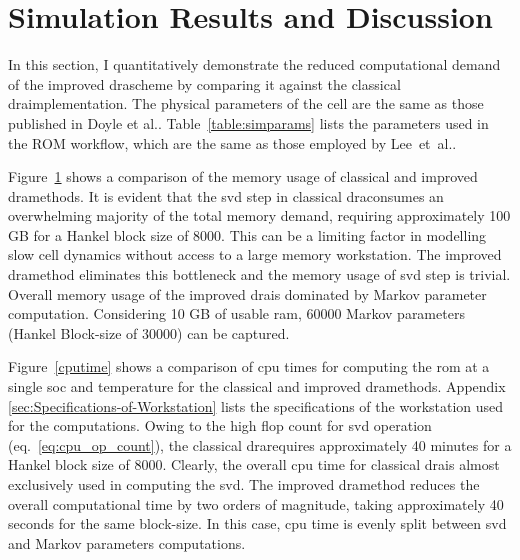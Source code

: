 \section{Simulation Results and Discussion\label{sec:Results} }

In this section, I quantitatively demonstrate the reduced computational
demand of the improved \gls{dra}scheme by comparing it against the classical
\gls{dra}implementation. The physical parameters of the cell are the same
as those published in Doyle et al.\cite{FullerDoyleNewman1994}.
Table~\ref{table:simparams} lists the parameters used in the ROM
workflow, which are the same as those employed by Lee~et~al.\cite{LeeChemistruckPlett2012}.

\begin{figure}
	\caption{}
	\label{memory}
\end{figure}

Figure~\ref{memory} shows a comparison of the memory usage of
classical and improved \gls{dra}methods. It is evident that the \gls{svd} step
in classical \gls{dra}consumes an overwhelming majority of the total memory
demand, requiring approximately 100 GB for a Hankel block size of
8000. This can be a limiting factor in modelling slow cell dynamics
without access to a large memory workstation. The improved \gls{dra}method
eliminates this bottleneck and the memory usage of \gls{svd} step is trivial.
Overall memory usage of the improved \gls{dra}is dominated by Markov parameter
computation. Considering 10 GB of usable \gls{ram}, 60000 Markov parameters
(Hankel Block-size of 30000) can be captured.

Figure~\ref{cputime} shows a comparison of \gls{cpu} times for computing
the \gls{rom} at a single \gls{soc} and temperature for the classical and improved
\gls{dra}methods. Appendix \ref{sec:Specifications-of-Workstation} lists the specifications
of the workstation used for the computations. Owing to the high flop
count for \gls{svd} operation (eq.~\ref{eq:cpu_op_count}), the classical
\gls{dra}requires approximately 40 minutes for a Hankel block size of 8000.
Clearly, the overall \gls{cpu} time for classical \gls{dra}is almost exclusively
used in computing the \gls{svd}. The improved \gls{dra}method reduces the overall
computational time by two orders of magnitude, taking approximately
40 seconds for the same block-size. In this case, \gls{cpu} time is evenly
split between \gls{svd} and Markov parameters computations.

